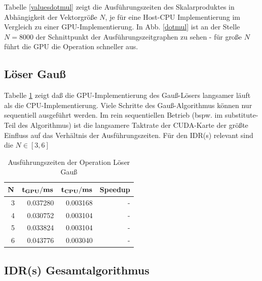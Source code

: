 \documentclass[journal]{IEEEtran}
\begin{document}
Tabelle \ref{valuesdotmul} zeigt die Ausführungszeiten des Skalarproduktes
in Abhängigkeit der Vektorgröße $N$, je für eine Host-CPU Implementierung im
Vergleich zu einer GPU-Implementierung.
In Abb. \ref{dotmul} ist an der Stelle $N = 8000$ der Schnittpunkt der
Ausführungszeitgraphen zu sehen - für große $N$ führt die GPU die Operation
schneller aus.




\subsection{Löser Gauß}

Tabelle \ref{valuessolver} zeigt daß die GPU-Implementierung des Gauß-Lösers
langsamer läuft als die CPU-Implementierung. Viele Schritte des Gauß-Algorithmus
können nur sequentiell ausgeführt werden. Im rein sequentiellen
Betrieb (bspw. im substitute-Teil des Algorithmus) ist die langsamere Taktrate
der CUDA-Karte der größte Einfluss auf das Verhältnis der Ausführungszeiten.
Für den IDR(s) relevant sind die $N \in[3,6]$

\begin{table}[h]
\renewcommand{\arraystretch}{1.3}
\caption{Ausführungszeiten der Operation Löser Gauß}
\label{valuessolver}
\centering
\begin{tabular}{|r||r|r|r|}
\hline
\bfseries $ \bf N$ & \bfseries{ $ \bf t_{GPU} / ms $ } &  $ \bf t_{CPU} / ms$ & \bfseries{Speedup} \\

\hline
\hline

3   &  0.037280 & 0.003168 & - \\
4   &  0.030752 & 0.003104 & - \\
5   &  0.033824 & 0.003104 & - \\
6   &  0.043776 & 0.003040 & - \\

\hline



\hline
\end{tabular}
\end{table}


\subsection{IDR(s) Gesamtalgorithmus}
\end{document}
